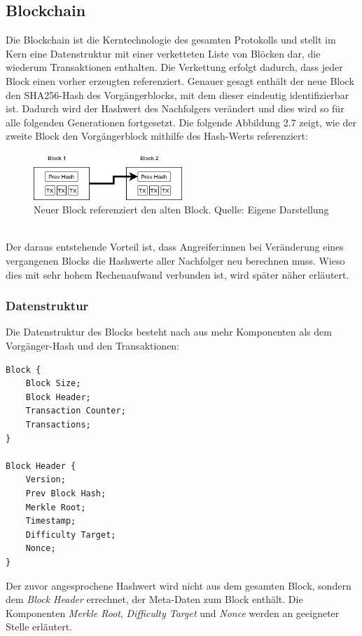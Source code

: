 \subsection{Blockchain}
Die Blockchain ist die Kerntechnologie des gesamten Protokolls und stellt im Kern eine Datenstruktur mit einer verketteten Liste von Blöcken dar, die wiederum Transaktionen enthalten. 
Die Verkettung erfolgt dadurch, dass jeder Block einen vorher erzeugten referenziert. 
Genauer gesagt enthält der neue Block den SHA256-Hash des Vorgängerblocks, mit dem dieser eindeutig identifizierbar ist. Dadurch wird der Hashwert des Nachfolgers verändert und dies wird so für alle folgenden Generationen fortgesetzt. Die folgende Abbildung 2.7 zeigt, wie der zweite Block den Vorgängerblock mithilfe des Hash-Werts referenziert:
\begin{figure}[htpb]
	\centering
	\includegraphics[width=0.5\textwidth]{images/chain.png}
	\caption{Neuer Block referenziert den alten Block.
	Quelle: Eigene Darstellung}
	\label{6braun:fig:chain}
\end{figure}\\

Der daraus entstehende Vorteil ist, dass Angreifer:innen bei Veränderung eines vergangenen Blocks die Hashwerte aller Nachfolger neu berechnen muss. Wieso dies mit sehr hohem Rechenaufwand verbunden ist, wird später näher erläutert.
\\
\subsubsection{Datenstruktur}
Die Datenstruktur des Blocks besteht nach \cite{antanopoulos_2014} aus mehr Komponenten als dem Vorgänger-Hash und den Transaktionen:
\begin{lstlisting}[mathescape, caption={Datenstruktur des Blocks},captionpos=b]
Block {
	Block Size;
	Block Header;
	Transaction Counter;
	Transactions;
}

Block Header {
	Version;
	Prev Block Hash;
	Merkle Root;
	Timestamp;
	Difficulty Target;
	Nonce;
}
\end{lstlisting}
Der zuvor angesprochene Hashwert wird nicht aus dem gesamten Block, sondern dem \emph{Block Header} errechnet, der Meta-Daten zum Block enthält. Die Komponenten \emph{Merkle Root}, \emph{Difficulty Target} und \emph{Nonce} werden an geeigneter Stelle erläutert.\\

